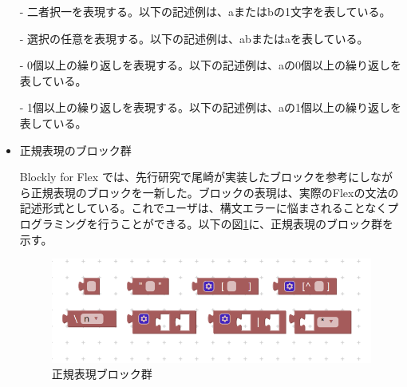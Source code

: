 \documentclass{risepaper}
\begin{document}
\begin{itemize}
- 二者択一を表現する。以下の記述例は、aまたはbの1文字を表している。


- 選択の任意を表現する。以下の記述例は、abまたはaを表している。


- 0個以上の繰り返しを表現する。以下の記述例は、aの0個以上の繰り返しを表している。


- 1個以上の繰り返しを表現する。以下の記述例は、aの1個以上の繰り返しを表している。


\item 正規表現のブロック群

Blockly for Flex では、先行研究で尾崎が実装したブロックを参考にしながら正規表現のブロックを一新した。ブロックの表現は、実際のFlexの文法の記述形式としている。これでユーザは、構文エラーに悩まされることなくプログラミングを行うことができる。以下の図\ref{fig:flex_RE_blocks}に、正規表現のブロック群を示す。

\begin{figure}[h]
\begin{center}
\includegraphics[scale=0.8]{img/flex_RE_blocks.PNG}
\caption{正規表現ブロック群}%
\label{fig:flex_RE_blocks}
\end{center}%
\end{figure}%


\end{itemize}
\end{document}
